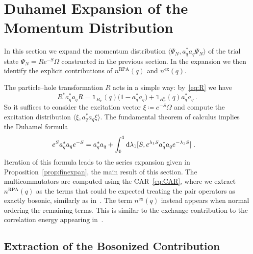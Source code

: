 \documentclass[12pt,a4paper]{article}
\numberwithin{equation}{section}
\newcommand{\1}{\mathbb{I}}
\newcommand{\di}{\textnormal{d}}
\newcommand{\ex}{\mathrm{ex}}
\newcommand{\F}{\mathrm{F}}
\newcommand{\RPA}{\mathrm{RPA}}
\theoremstyle{plain}
\theoremstyle{definition}
\theoremstyle{remark}
\theoremstyle{plain}
\theoremstyle{definition}
\theoremstyle{remark}
\begin{document}
\section{Duhamel Expansion of the Momentum Distribution}\label{sec:extraction}

In this section we expand the momentum distribution $ \langle \Psi_N, a_q^* a_q \Psi_N \rangle $ of the trial state $ \Psi_N = R e^{-S} \Omega $ constructed in the previous section. In the expansion we then identify the explicit contributions of $ n^{\RPA}(q) $ and $ n^{\ex}(q) $.

The particle--hole transformation $ R $ acts in a simple way: by~\eqref{eq:R} we have
\begin{equation} \label{eq:momentum_dist_R_trafo}
	R^* a_q^* a_q R
	= \mathds{1}_{B_{\F}}(q) \big( 1 - a_q^* a_q  \big)
		+ \mathds{1}_{B_{\F}^c}(q)  a_q^* a_q \;.
\end{equation}
So it suffices to consider the excitation vector $ \xi \coloneq e^{-S} \Omega $ and compute the excitation distribution $ \langle \xi, a_q^* a_q \xi \rangle $. The fundamental theorem of calculus implies the Duhamel formula
\begin{equation} \label{eq:duhamelexpansion_blueprint}
\begin{aligned}
	e^{S} a_q^* a_q e^{-S}
& = a_q^* a_q
		+ \int_0^1 \di \lambda_1   [S, e^{\lambda_1 S} a_q^* a_q e^{-\lambda_1 S}] \;.
\end{aligned}
\end{equation}
Iteration of this formula leads to the series expansion given in Proposition~\ref{prop:finexpan}, the main result of this section. The multicommutators are computed using the CAR~\eqref{eq:CAR}, where we extract $ n^{\RPA}(q) $ as the terms that could be expected treating the pair operators as exactly bosonic, similarly as in~\cite{BL25}. The term $ n^{\ex}(q) $ instead appears when normal ordering the remaining terms. This is similar to the exchange contribution to the correlation energy appearing in~\cite{CHN23}.


\subsection{Extraction of the Bosonized Contribution}
\label{sec:extraction_bos}
\end{document}
